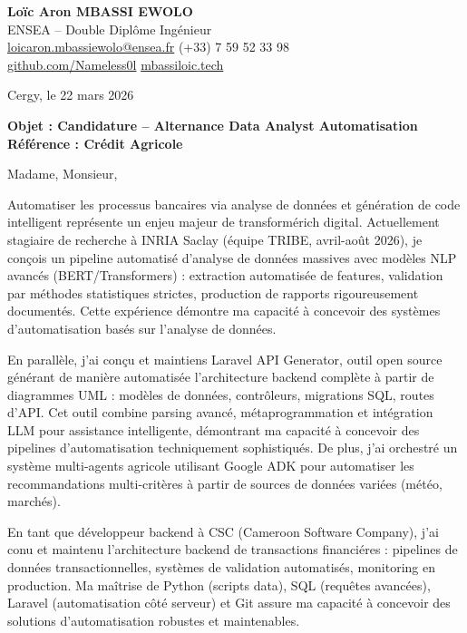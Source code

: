 \documentclass[a4paper,11pt]{article}
\begin{document}
\noindent
\textbf{Lo\"ic Aron MBASSI EWOLO} \\
ENSEA -- Double Dipl\^ome Ing\'enieur \\
\href{mailto:loicaron.mbassiewolo@ensea.fr}{loicaron.mbassiewolo@ensea.fr} \quad (+33) 7 59 52 33 98 \\
\href{https://github.com/Nameless0l}{github.com/Nameless0l} \quad \href{https://mbassiloic.tech}{mbassiloic.tech}

\vspace{1em}
\noindent Cergy, le 22 mars 2026

\vspace{1em}
\noindent
\textbf{Objet : Candidature -- Alternance Data Analyst Automatisation} \\
\textbf{R\'ef\'erence : Cr\'edit Agricole}

\vspace{1.5em}
\noindent Madame, Monsieur,

Automatiser les processus bancaires via analyse de donn\'ees et g\'en\'eration de code intelligent repr\'esente un enjeu majeur de transform\'erich digital. Actuellement stagiaire de recherche \`a INRIA Saclay (\'equipe TRIBE, avril-ao\^ut 2026), je con\c{c}ois un pipeline automatis\'e d'analyse de donn\'ees massives avec mod\`eles NLP avanc\'es (BERT/Transformers) : extraction automatisée de features, validation par m\'ethodes statistiques strictes, production de rapports rigoureusement document\'es. Cette exp\'erience démontre ma capacit\'e \`a concevoir des syst\`emes d'automatisation bas\'es sur l'analyse de donn\'ees.

\vspace{0.8em}

En parall\`ele, j'ai con\c{c}u et maintiens Laravel API Generator, outil open source g\'en\'erant de mani\`ere automatis\'ee l'architecture backend compl\`ete \`a partir de diagrammes UML : mod\`eles de donn\'ees, contr\^oleurs, migrations SQL, routes d'API. Cet outil combine parsing avanc\'e, m\'etaprogrammation et intégration LLM pour assistance intelligente, d\'emontrant ma capacit\'e \`a concevoir des pipelines d'automatisation techniquement sophistiqu\'es. De plus, j'ai orchestr\'e un syst\`eme multi-agents agricole utilisant Google ADK pour automatiser les recommandations multi-crit\`eres \`a partir de sources de donn\'ees vari\'ees (m\'et\'eo, march\'es).

\vspace{0.8em}

En tant que d\'eveloppeur backend \`a CSC (Cameroon Software Company), j'ai conu et maintenu l'architecture backend de transactions financi\'eres : pipelines de donn\'ees transactionnelles, syst\`emes de validation automatis\'es, monitoring en production. Ma ma\^itrise de Python (scripts data), SQL (requ\^etes avanc\'ees), Laravel (automatisation c\^ot\'e serveur) et Git assure ma capacit\'e \`a concevoir des solutions d'automatisation robustes et maintenables.
\end{document}
